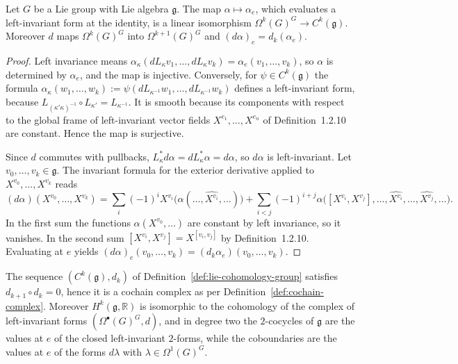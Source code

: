 \begin{proposition}\label{prop:invariant-forms}
	Let $G$ be a Lie group with Lie algebra $\mathfrak{g}$. The map $\alpha\mapsto\alpha_e$, which evaluates a left-invariant form at the identity, is a linear isomorphism $\Omega^k(G)^G\to C^k(\mathfrak{g})$. Moreover $d$ maps $\Omega^k(G)^G$ into $\Omega^{k+1}(G)^G$ and $(d\alpha)_e=d_k(\alpha_e)$.
\end{proposition}

\begin{proof}
	Left invariance means $\alpha_\kappa(dL_\kappa v_1,\dots,dL_\kappa v_k)=\alpha_e(v_1,\dots,v_k)$, so $\alpha$ is determined by $\alpha_e$, and the map is injective. Conversely, for $\psi\in C^k(\mathfrak{g})$ the formula $\alpha_\kappa(w_1,\dots,w_k):=\psi(dL_{\kappa^{-1}}w_1,\dots,dL_{\kappa^{-1}}w_k)$ defines a left-invariant form, because $L_{(\kappa'\kappa)^{-1}}\circ L_{\kappa'}=L_{\kappa^{-1}}$. It is smooth because its components with respect to the global frame of left-invariant vector fields $X^{e_1},\dots,X^{e_n}$ of Definition~1.2.10 are constant. Hence the map is surjective.
	
	Since $d$ commutes with pullbacks, $L_\kappa^*d\alpha=dL_\kappa^*\alpha=d\alpha$, so $d\alpha$ is left-invariant. Let $v_0,\dots,v_k\in\mathfrak{g}$. The invariant formula for the exterior derivative \cite[TODO-location]{TODO-Lee13} applied to $X^{v_0},\dots,X^{v_k}$ reads
	\begin{equation*}
		(d\alpha)(X^{v_0},\dots,X^{v_k})=\sum_i(-1)^iX^{v_i}\big(\alpha(\dots,\widehat{X^{v_i}},\dots)\big)+\sum_{i<j}(-1)^{i+j}\alpha\big([X^{v_i},X^{v_j}],\dots,\widehat{X^{v_i}},\dots,\widehat{X^{v_j}},\dots\big).
	\end{equation*}
	In the first sum the functions $\alpha(X^{v_0},\dots)$ are constant by left invariance, so it vanishes. In the second sum $[X^{v_i},X^{v_j}]=X^{[v_i,v_j]}$ by Definition~1.2.10. Evaluating at $e$ yields $(d\alpha)_e(v_0,\dots,v_k)=(d_k\alpha_e)(v_0,\dots,v_k)$.
\end{proof}

\begin{corollary}\label{cor:lie-complex}
	The sequence $(C^k(\mathfrak{g}),d_k)$ of Definition~\ref{def:lie-cohomology-group} satisfies $d_{k+1}\circ d_k=0$, hence it is a cochain complex as per Definition~\ref{def:cochain-complex}. Moreover $H^k(\mathfrak{g},\mathbb{R})$ is isomorphic to the cohomology of the complex of left-invariant forms $(\Omega^\bullet(G)^G,d)$, and in degree two the $2$-cocycles of $\mathfrak{g}$ are the values at $e$ of the closed left-invariant $2$-forms, while the coboundaries are the values at $e$ of the forms $d\lambda$ with $\lambda\in\Omega^1(G)^G$.
\end{corollary}

